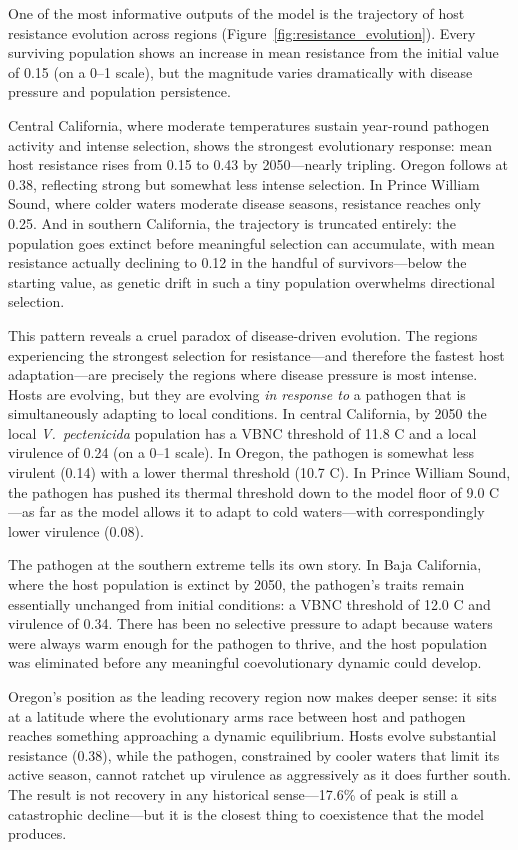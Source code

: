 One of the most informative outputs of the model is the trajectory of host
resistance evolution across regions (Figure~\ref{fig:resistance_evolution}). Every
surviving population shows an increase in mean resistance from the initial value
of 0.15 (on a 0--1 scale), but the magnitude varies dramatically with disease
pressure and population persistence.

Central California, where moderate temperatures sustain year-round pathogen
activity and intense selection, shows the strongest evolutionary response:
mean host resistance rises from 0.15 to 0.43 by 2050---nearly tripling. Oregon
follows at 0.38, reflecting strong but somewhat less intense selection. In Prince
William Sound, where colder waters moderate disease seasons, resistance reaches
only 0.25. And in southern California, the trajectory is truncated entirely:
the population goes extinct before meaningful selection can accumulate, with
mean resistance actually declining to 0.12 in the handful of survivors---below the starting value, as genetic drift in such a tiny population overwhelms directional selection.

This pattern reveals a cruel paradox of disease-driven evolution. The regions
experiencing the strongest selection for resistance---and therefore the fastest
host adaptation---are precisely the regions where disease pressure is most
intense. Hosts are evolving, but they are evolving \textit{in response to} a
pathogen that is simultaneously adapting to local conditions. In central
California, by 2050 the local \textit{V.\ pectenicida} population has a VBNC
threshold of 11.8\textdegree{} C and a local virulence of 0.24 (on a 0--1 scale).
In Oregon, the pathogen is somewhat less virulent (0.14) with a lower thermal
threshold (10.7\textdegree{} C). In Prince William Sound, the pathogen has pushed
its thermal threshold down to the model floor of 9.0\textdegree{} C---as far as
the model allows it to adapt to cold waters---with correspondingly lower
virulence (0.08).

The pathogen at the southern extreme tells its own story. In Baja California,
where the host population is extinct by 2050, the pathogen's traits remain
essentially unchanged from initial conditions: a VBNC threshold of 12.0\textdegree{} C
and virulence of 0.34. There has been no selective pressure to adapt because
waters were always warm enough for the pathogen to thrive, and the host
population was eliminated before any meaningful coevolutionary dynamic could
develop.

Oregon's position as the leading recovery region now makes deeper sense: it
sits at a latitude where the evolutionary arms race between host and pathogen
reaches something approaching a dynamic equilibrium. Hosts evolve substantial
resistance (0.38), while the pathogen, constrained by cooler waters that limit
its active season, cannot ratchet up virulence as aggressively as it does
further south. The result is not recovery in any historical sense---17.6\% of
peak is still a catastrophic decline---but it is the closest thing to
coexistence that the model produces.

